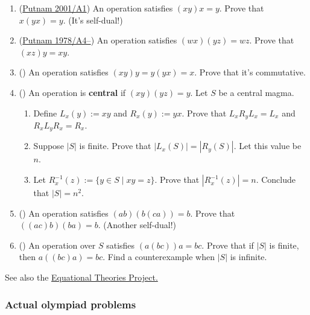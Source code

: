 \documentclass[11pt,paper=letter]{scrartcl}
\begin{document}
\begin{enumerate}

\item (\href{https://artofproblemsolving.com/community/c7h466470p2612317}{Putnam 2001/A1}) An operation satisfies $(xy)x = y$. Prove that $x(yx) = y$. (It's self-dual!)

\item (\href{https://artofproblemsolving.com/community/c7h2837097p25118364}{Putnam 1978/A4--}) An operation satisfies $(wx)(yz) = wz$. Prove that $(xz)y = xy$.

\item (\href{https://math.stackexchange.com/a/5056626/680415}{\!}) An operation satisfies $(xy)y = y(yx) = x$. Prove that it's commutative.

\item (\href{https://www.jstor.org/stable/2314563}{\!}) An operation is \textbf{central} if $(xy)(yz) = y$. Let $S$ be a central magma.

\begin{enumerate}
\item Define $L_x(y) := xy$ and $R_x(y) := yx$. Prove that $L_xR_yL_x = L_x$ and $R_xL_yR_x = R_x$.

\item Suppose $|S|$ is finite. Prove that $|L_x(S)| = |R_y(S)|$. Let this value be $n$.

\item Let $R_x^{-1}(z) := \{y \in S \mid xy = z\}$. Prove that $|R_x^{-1}(z)| = n$. Conclude that $|S| = n^2$.
\end{enumerate}

\item (\href{https://teorth.github.io/equational_theories/blueprint/weak-central-groupoids-chapter.html\#1485-dual}{\!}) An operation satisfies $(ab)(b(ca)) = b$. Prove that $((ac)b)(ba) = b$. (Another self-dual!)

\item (\href{https://teorth.github.io/equational_theories/blueprint/infinite-model-chapter.html\#finite_imp_3994_3588}{\!}) An operation over $S$ satisfies $(a(bc))a = bc$. Prove that if $|S|$ is finite, then $a((bc)a) = bc$. Find a counterexample when $|S|$ is infinite.
\end{enumerate}

See also the \href{https://teorth.github.io/equational_theories/}{Equational Theories Project.}

\subsubsection*{Actual olympiad problems}
\end{document}

